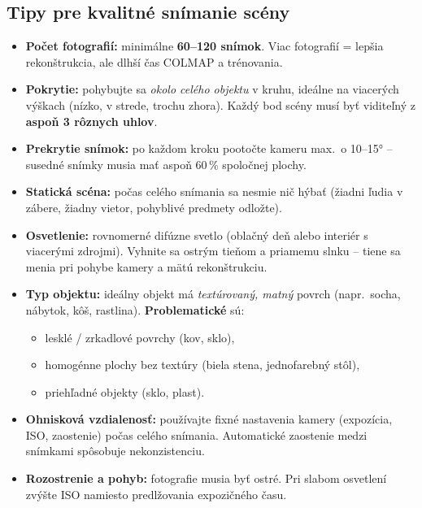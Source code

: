\documentclass{article}
\begin{document}
\subsection*{Tipy pre kvalitné snímanie scény}

\begin{itemize}
    \item \textbf{Počet fotografií:} minimálne \textbf{60–120 snímok}.
          Viac fotografií = lepšia rekonštrukcia, ale dlhší čas COLMAP a trénovania.
    \item \textbf{Pokrytie:} pohybujte sa \emph{okolo celého objektu} v kruhu,
          ideálne na viacerých výškach (nízko, v strede, trochu zhora).
          Každý bod scény musí byť viditeľný z \textbf{aspoň 3 rôznych uhlov}.
    \item \textbf{Prekrytie snímok:} po každom kroku pootočte kameru max.\
          o 10–15° – susedné snímky musia mať aspoň 60\,\% spoločnej plochy.
    \item \textbf{Statická scéna:} počas celého snímania sa nesmie nič hýbať
          (žiadni ľudia v zábere, žiadny vietor, pohyblivé predmety odložte).
    \item \textbf{Osvetlenie:} rovnomerné difúzne svetlo (oblačný deň alebo
          interiér s viacerými zdrojmi).
          Vyhnite sa ostrým tieňom a priamemu slnku – tiene sa menia
          pri pohybe kamery a mätú rekonštrukciu.
    \item \textbf{Typ objektu:} ideálny objekt má \emph{textúrovaný, matný}
          povrch (napr.\ socha, nábytok, kôš, rastlina).
          \textbf{Problematické} sú:
          \begin{itemize}
              \item lesklé / zrkadlové povrchy (kov, sklo),
              \item homogénne plochy bez textúry (biela stena, jednofarebný stôl),
              \item priehľadné objekty (sklo, plast).
          \end{itemize}
    \item \textbf{Ohnisková vzdialenosť:} používajte fixné nastavenia kamery
          (expozícia, ISO, zaostenie) počas celého snímania.
          Automatické zaostenie medzi snímkami spôsobuje nekonzistenciu.
    \item \textbf{Rozostrenie a pohyb:} fotografie musia byť ostré.
          Pri slabom osvetlení zvýšte ISO namiesto predlžovania expozičného času.
\end{itemize}
\end{document}
